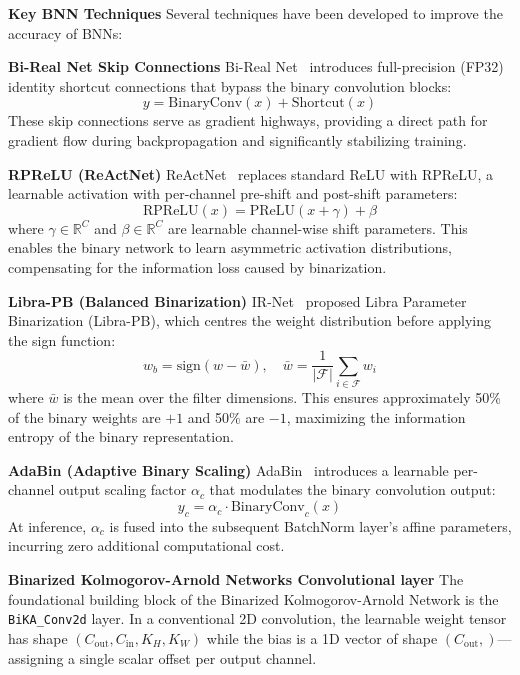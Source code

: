 \documentclass[a4paper]{report}
\begin{document}
\textbf{Key BNN Techniques}
Several techniques have been developed to improve the accuracy of BNNs:

\textbf{Bi-Real Net Skip Connections}
Bi-Real Net~\cite{qin2020bireal} introduces full-precision (FP32) identity shortcut connections that bypass the binary convolution blocks:
\begin{equation}
    y = \text{BinaryConv}(x) + \text{Shortcut}(x)
\end{equation}
These skip connections serve as gradient highways, providing a direct path for gradient flow during backpropagation and significantly stabilizing training.

\textbf{RPReLU (ReActNet)}
ReActNet~\cite{liu2020reactnet} replaces standard ReLU with RPReLU, a learnable activation with per-channel pre-shift and post-shift parameters:
\begin{equation}
    \text{RPReLU}(x) = \text{PReLU}(x + \gamma) + \beta
\end{equation}
where $\gamma \in \mathbb{R}^C$ and $\beta \in \mathbb{R}^C$ are learnable channel-wise shift parameters. This enables the binary network to learn asymmetric activation distributions, compensating for the information loss caused by binarization.

\textbf{Libra-PB (Balanced Binarization)}
IR-Net~\cite{qin2020irnet} proposed Libra Parameter Binarization (Libra-PB), which centres the weight distribution before applying the sign function:
\begin{equation}
    w_b = \text{sign}(w - \bar{w}), \quad \bar{w} = \frac{1}{|\mathcal{F}|}\sum_{i \in \mathcal{F}} w_i
\end{equation}
where $\bar{w}$ is the mean over the filter dimensions. This ensures approximately 50\% of the binary weights are $+1$ and 50\% are $-1$, maximizing the information entropy of the binary representation.

\textbf{AdaBin (Adaptive Binary Scaling)}
AdaBin~\cite{tu2022adabin} introduces a learnable per-channel output scaling factor $\alpha_c$ that modulates the binary convolution output:
\begin{equation}
    y_c = \alpha_c \cdot \text{BinaryConv}_c(x)
\end{equation}
At inference, $\alpha_c$ is fused into the subsequent BatchNorm layer's affine parameters, incurring zero additional computational cost.

\textbf{Binarized Kolmogorov-Arnold Networks Convolutional layer}
\label{sec:bika_conv2d}
The foundational building block of the Binarized Kolmogorov-Arnold Network is the \texttt{BiKA\_Conv2d} layer. In a conventional 2D convolution, the learnable weight tensor has shape $(C_{\text{out}}, C_{\text{in}}, K_H, K_W)$ while the bias is a 1D vector of shape $(C_{\text{out}},)$—assigning a single scalar offset per output channel. 
\end{document}
